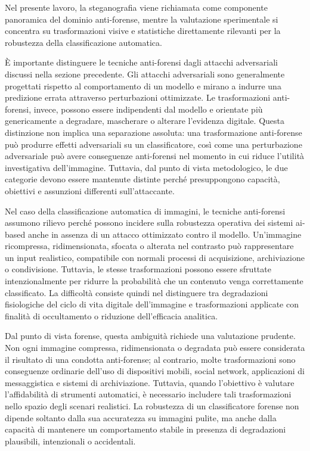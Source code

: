 Nel presente lavoro, la steganografia viene richiamata come componente panoramica del dominio anti-forense, mentre la valutazione sperimentale si concentra su trasformazioni visive e statistiche direttamente rilevanti per la robustezza della classificazione automatica.

È importante distinguere le tecniche anti-forensi dagli attacchi adversariali discussi nella sezione precedente. Gli attacchi adversariali sono generalmente progettati rispetto al comportamento di un modello e mirano a indurre una predizione errata attraverso perturbazioni ottimizzate. Le trasformazioni anti-forensi, invece, possono essere indipendenti dal modello e orientate più genericamente a degradare, mascherare o alterare l'evidenza digitale. Questa distinzione non implica una separazione assoluta: una trasformazione anti-forense può produrre effetti adversariali su un classificatore, così come una perturbazione adversariale può avere conseguenze anti-forensi nel momento in cui riduce l'utilità investigativa dell'immagine. Tuttavia, dal punto di vista metodologico, le due categorie devono essere mantenute distinte perché presuppongono capacità, obiettivi e assunzioni differenti sull'attaccante.

Nel caso della classificazione automatica di immagini, le tecniche anti-forensi assumono rilievo perché possono incidere sulla robustezza operativa dei sistemi \gls{ai}-based anche in assenza di un attacco ottimizzato contro il modello. Un'immagine ricompressa, ridimensionata, sfocata o alterata nel contrasto può rappresentare un input realistico, compatibile con normali processi di acquisizione, archiviazione o condivisione. Tuttavia, le stesse trasformazioni possono essere sfruttate intenzionalmente per ridurre la probabilità che un contenuto venga correttamente classificato. La difficoltà consiste quindi nel distinguere tra degradazioni fisiologiche del ciclo di vita digitale dell'immagine e trasformazioni applicate con finalità di occultamento o riduzione dell'efficacia analitica.

Dal punto di vista forense, questa ambiguità richiede una valutazione prudente. Non ogni immagine compressa, ridimensionata o degradata può essere considerata il risultato di una condotta anti-forense; al contrario, molte trasformazioni sono conseguenze ordinarie dell'uso di dispositivi mobili, social network, applicazioni di messaggistica e sistemi di archiviazione. Tuttavia, quando l'obiettivo è valutare l'affidabilità di strumenti automatici, è necessario includere tali trasformazioni nello spazio degli scenari realistici. La robustezza di un classificatore forense non dipende soltanto dalla sua accuratezza su immagini pulite, ma anche dalla capacità di mantenere un comportamento stabile in presenza di degradazioni plausibili, intenzionali o accidentali.

